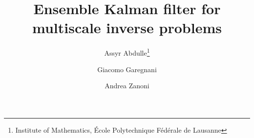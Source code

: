 \usepackage[T1]{fontenc}
\usepackage{lmodern}
\usepackage[utf8]{inputenc}
\usepackage{microtype}
\usepackage{framed}
\usepackage{listings}
\usepackage{vmargin}
\usepackage{setspace}
\usepackage{mathrsfs, mathenv}
\usepackage{amsmath, amsthm, amssymb, amsfonts, amscd}
\usepackage{graphicx}
\usepackage{epstopdf}
\usepackage[svgnames]{xcolor}
\usepackage{hyperref}
\hypersetup{citecolor=blue, colorlinks=true, linkcolor=black}
\setlength{\parskip}{6pt}
\setlength\parindent{0pt}
\usepackage{subcaption}
\usepackage{bbm}
\usepackage{cite}
\usepackage{verbatim}
\usepackage{pgfplots}
\usepackage{tikz}
\usepackage{etoolbox}
\usepackage{color}
\usepackage{lipsum}
\usepackage{ifthen}
\usepackage[linesnumbered, ruled, vlined]{algorithm2e}

\theoremstyle{plain}
\newtheorem{theorem}{Theorem}
\newtheorem{corollary}{Corollary}
\newtheorem{lemma}{Lemma}
\newtheorem{proposition}{Proposition}

\theoremstyle{definition}
\newtheorem{definition}{Definition}

\theoremstyle{remark}
\newtheorem{remark}{Remark}
\newtheorem{assumption}{Assumption}
\newtheorem{example}{Example}


\ifpdf
\else
\fi

\usepackage{mathtools}


\usepackage{booktabs}

\usepackage{pgfplots}
\usepackage{tikz}
\usetikzlibrary{patterns,arrows,decorations.pathmorphing,backgrounds,positioning,fit,matrix}
\usepackage[labelfont=bf]{caption}
\setlength{\belowcaptionskip}{-5pt}
\usepackage{here}
\usepackage[font=normal]{subcaption}

\usepackage{enumitem}

\newcommand{\creflastconjunction}{, and~}


\newcommand{\email}[1]{\href{#1}{#1}}
\newcommand{\TheTitle}{Ensemble Kalman filter for multiscale inverse problems} 
\newcommand{\TheAuthors}{A. Abdulle, G. Garegnani}
\title{{\TheTitle}}
\newcommand*\samethanks[1][\value{footnote}]{\footnotemark[#1]}
\author{Assyr Abdulle\thanks{Institute of Mathematics, \'Ecole Polytechnique F\'ed\'erale de Lausanne}
	\and
	Giacomo Garegnani\samethanks
	\and 
	Andrea Zanoni\samethanks
	}
\date{}

